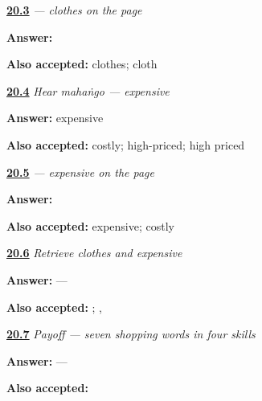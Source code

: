 \noindent\begin{minipage}[t]{\linewidth}
\raggedright
\hyperlink{review-MW-C15-kapda-dictation}{\textbf{20.3}} \emph{ — clothes on the page}\par
\small \textbf{Answer:} \par
\footnotesize \textbf{Also accepted:}  clothes;  cloth
\end{minipage}\par\medskip

\noindent\begin{minipage}[t]{\linewidth}
\raggedright
\hyperlink{review-MW-C15-hear-mahango-meaning}{\textbf{20.4}} \emph{Hear \emph{mahaṅgo} — expensive}\par
\small \textbf{Answer:} expensive\par
\footnotesize \textbf{Also accepted:} costly; high-priced; high priced
\end{minipage}\par\medskip

\noindent\begin{minipage}[t]{\linewidth}
\raggedright
\hyperlink{review-MW-C15-mahango-dictation}{\textbf{20.5}} \emph{ — expensive on the page}\par
\small \textbf{Answer:} \par
\footnotesize \textbf{Also accepted:}  expensive;  costly
\end{minipage}\par\medskip

\noindent\begin{minipage}[t]{\linewidth}
\raggedright
\hyperlink{review-MW-R15-shopping-new-two-recall}{\textbf{20.6}} \emph{Retrieve clothes and expensive}\par
\small \textbf{Answer:}  — \par
\footnotesize \textbf{Also accepted:}  ; , 
\end{minipage}\par\medskip

\noindent\begin{minipage}[t]{\linewidth}
\raggedright
\hyperlink{review-MW-C15-shopping-seven-payoff}{\textbf{20.7}} \emph{Payoff — seven shopping words in four skills}\par
\small \textbf{Answer:}  — \par
\footnotesize \textbf{Also accepted:}  
\end{minipage}\par\medskip

